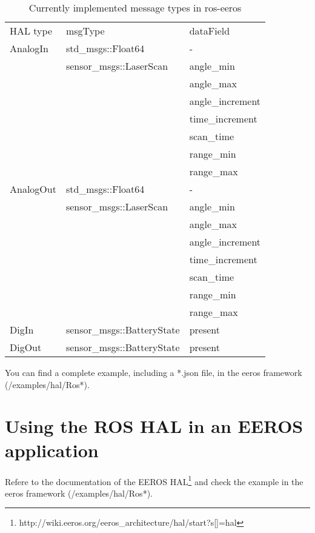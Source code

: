 \begin{table}[]
\centering
\caption{Currently implemented message types in ros-eeros}
\label{tableImplementedMsgTypes}
\begin{tabular}{lll}
\cline{2-3}
HAL type  & msgType                    & dataField        \\ \cline{2-3} 
AnalogIn  & std\_msgs::Float64         & -                \\
          & sensor\_msgs::LaserScan    & angle\_min       \\
          &                            & angle\_max       \\
          &                            & angle\_increment \\
          &                            & time\_increment  \\
          &                            & scan\_time       \\
          &                            & range\_min       \\
          &                            & range\_max       \\
AnalogOut & std\_msgs::Float64         & -                \\
          & sensor\_msgs::LaserScan    & angle\_min       \\
          &                            & angle\_max       \\
          &                            & angle\_increment \\
          &                            & time\_increment  \\
          &                            & scan\_time       \\
          &                            & range\_min       \\
          &                            & range\_max       \\
DigIn     & sensor\_msgs::BatteryState & present          \\
DigOut    & sensor\_msgs::BatteryState & present          \\ \cline{2-3} 
\end{tabular}
\end{table}

You can find a complete example, including a *.json file, in the eeros framework (/examples/hal/Ros*).


\section{Using the ROS HAL in an EEROS application}
Refere to the documentation of the EEROS HAL\footnote{http://wiki.eeros.org/eeros\_architecture/hal/start?s[]=hal} and check the example in the eeros framework (/examples/hal/Ros*).


